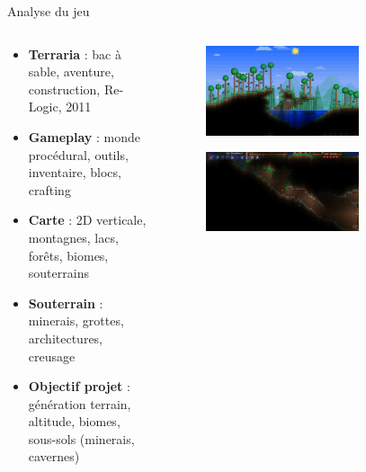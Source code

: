 \documentclass[aspectratio=169]{beamer}
\begin{document}
\begin{frame}{Analyse du jeu}
    \begin{columns}
        \centering
        \begin{column}{0.5\textwidth}
            \centering
            \begin{itemize}
                \item \textbf{Terraria} : bac à sable, aventure, construction, Re-Logic, 2011
                \item \textbf{Gameplay} : monde procédural, outils, inventaire, blocs, crafting
                \item \textbf{Carte} : 2D verticale, montagnes, lacs, forêts, biomes, souterrains
                \item \textbf{Souterrain} : minerais, grottes, architectures, creusage
                \item \textbf{Objectif projet} : génération terrain, altitude, biomes, sous-sols (minerais, cavernes)
            \end{itemize}
        \end{column}
        \begin{column}{0.5\textwidth}
            \centering
            \begin{figure}
                \centering
                \includegraphics[width=0.7\textwidth]{assets/terraria_forest_biome.jpg}
            \end{figure}
            \begin{figure}
                \centering
                \includegraphics[width=0.7\textwidth]{assets/terraria_cavern.png}
            \end{figure}
        \end{column}
    \end{columns}
\end{frame}
\end{document}
